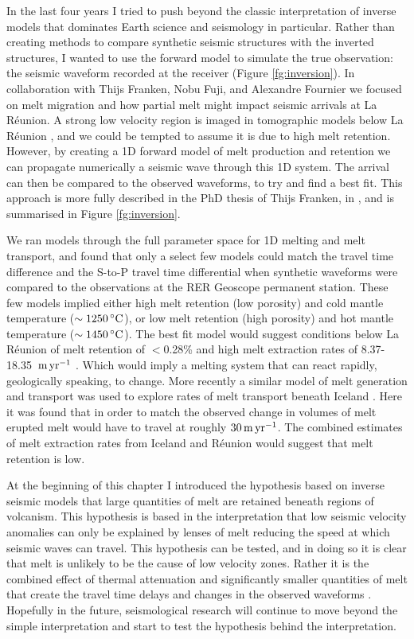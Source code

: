 In the last four years I tried to push beyond the classic interpretation of inverse models that dominates Earth science and seismology in particular. Rather than creating methods to compare synthetic seismic structures with the inverted structures, I wanted to use the forward model to simulate the true observation: the seismic waveform recorded at the receiver (Figure \ref{fg:inversion}). In collaboration with Thijs Franken, Nobu Fuji, and Alexandre Fournier we focused on melt migration and how partial melt might impact seismic arrivals at La Réunion.  A strong low velocity region is imaged in tomographic models below La Réunion \citep{mazzullo-etal-2017}, and we could be tempted to assume it is due to high melt retention. However, by creating a 1D forward model of melt production and retention we can propagate numerically a seismic wave through this 1D system. The arrival can then be compared to the observed waveforms, to try and find a best fit. This approach is more fully described in the PhD thesis of Thijs Franken, in \cite{franken-etal-2020}, and is summarised in Figure \ref{fg:inversion}.

We ran models through the full parameter space for 1D melting and melt transport, and found that only a select few models could match the travel time difference and the S-to-P travel time differential when synthetic waveforms were compared to the observations at the RER Geoscope permanent station. These few models implied either high melt retention (low porosity) and cold mantle temperature ($\sim 1250\rm\,^{\circ}C$), or low melt retention (high porosity) and hot mantle temperature ($\sim 1450\rm\,^{\circ}C$). The best fit model would suggest conditions below La Réunion of melt retention of $<$0.28\% and high melt extraction rates of 8.37-18.35 $\rm\,m\,yr^{-1}$ \citep{franken-etal-2020}. Which would imply a melting system that can react rapidly, geologically speaking, to change. More recently a similar model of melt generation and transport was used to explore rates of melt transport beneath Iceland \citep{jones-2020}. Here it was found that in order to match the observed change in volumes of melt erupted melt would have to travel at roughly $30\rm\,m\,yr^{-1}$. The combined estimates of melt extraction rates from Iceland and Réunion would suggest that melt retention is low.

At the beginning of this chapter I introduced the hypothesis based on inverse seismic models that large quantities of melt are retained beneath regions of volcanism. This hypothesis is based in the interpretation that low seismic velocity anomalies can only be explained by lenses of melt reducing the speed at which seismic waves can travel. This hypothesis can be tested, and in doing so it is clear that melt is unlikely to be the cause of low velocity zones. Rather it is the combined effect of thermal attenuation and significantly smaller quantities of melt that create the travel time delays and changes in the observed waveforms \citep{franken-etal-2020}. Hopefully in the future, seismological research will continue to move beyond the simple interpretation and start to test the hypothesis behind the interpretation.

